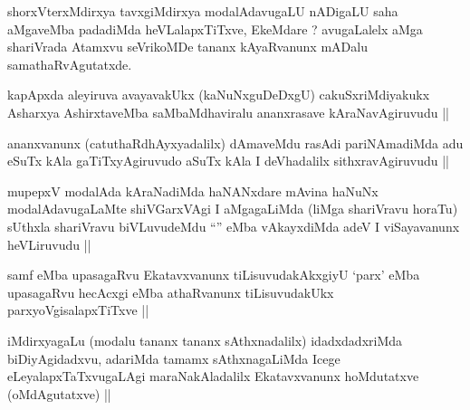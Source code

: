 
\begin{artha}
shorxVterxMdirxya tavxgiMdirxya modalAdavugaLU nADigaLU saha aMgaveMba
padadiMda heVLalapxTiTxve, EkeMdare ? avugaLalelx aMga shariVrada
Atamxvu seVrikoMDe tananx kAyaRvanunx mADalu samathaRvAgutatxde.
\end{artha}


\begin{artha}
kapApxda aleyiruva avayavakUkx (kaNuNxguDeDxgU) cakuSxriMdiyakukx
Asharxya AshirxtaveMba saMbaMdhaviralu ananxrasave kAraNavAgiruvudu ||
\end{artha}


\begin{artha}
ananxvanunx (catuthaRdhAyxyadalilx) dAmaveMdu rasAdi pariNAmadiMda adu
eSuTx kAla gaTiTxyAgiruvudo aSuTx kAla I deVhadalilx sithxravAgiruvudu ||
\end{artha}


\begin{artha}
mupepxV modalAda kAraNadiMda haNANxdare mAvina haNuNx
modalAdavugaLaMte shiVGarxVAgi I aMgagaLiMda (liMga shariVravu horaTu)
sUthxla shariVravu biVLuvudeMdu ``\stext'' eMba vAkayxdiMda adeV I
viSayavanunx heVLiruvudu ||
\end{artha}


\begin{artha}
samf eMba upasagaRvu Ekatavxvanunx tiLisuvudakAkxgiyU `parx' eMba
upasagaRvu hecAcxgi eMba athaRvanunx tiLisuvudakUkx
parxyoVgisalapxTiTxve ||
\end{artha}


\begin{artha}
iMdirxyagaLu (modalu tananx tananx sAthxnadalilx) idadxdadxriMda
biDiyAgidadxvu, adariMda tamamx sAthxnagaLiMda Icege
eLeyalapxTaTxvugaLAgi maraNakAladalilx Ekatavxvanunx hoMdutatxve
(oMdAgutatxve) ||
\end{artha}


